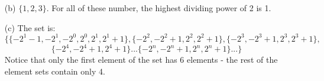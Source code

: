 \documentclass[12pt, a4paper]{article}
\begin{document}
\begin{itemize}
\begin{itemize}
\item[]

\item[(b)]
$\{1, 2, 3\}$. For all of these number, the highest dividing power of 2 is 1.

\item[]

\item[(c)]
The set is:
$$\{\{-2^1 - 1, -2^1, -2^0, 2^0, 2^1, 2^1 + 1\}, \{-2^2, -2^2 + 1, 2^2, 2^2 + 1\}, \{-2^3, -2^3 + 1, 2^3, 2^3 + 1\},$$
$$\{-2^4, -2^4 + 1, 2^4 + 1\} ... \{-2^n, -2^n + 1, 2^n, 2^n + 1\} ...\}$$
Notice that only the first element of the set has 6 elements - the rest of the element sets contain only 4.
\end{itemize}
\end{itemize}
\end{document}
